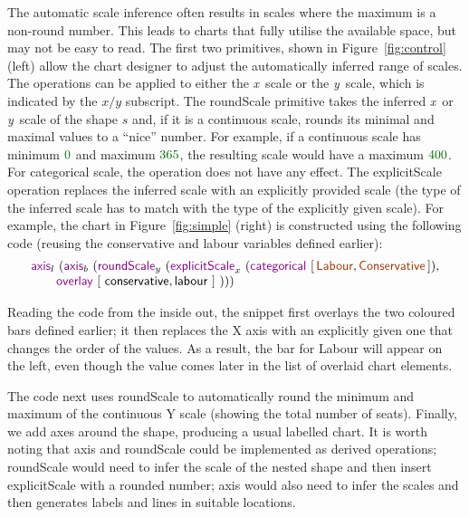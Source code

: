 \documentclass{jfp}
\newcommand{\X}{\emph{x}\ }
\newcommand{\Y}{\emph{y}\ }
\newcommand{\num}[1]{\textcolor{numclr}{#1}}
\newcommand{\strf}[1]{\textnormal{\textcolor{strclr}{\sffamily #1}}}
\newcommand{\ident}[1]{\textnormal{\textcolor{idclr}{\sffamily #1}}}
\newcommand{\kvd}[1]{\textnormal{\textcolor{kvdclr}{\sffamily #1}}}
\begin{document}
The automatic scale inference often results in scales where the maximum is a non-round number.
This leads to charts that fully utilise the available space, but may not be easy to read.
The first two primitives, shown in Figure~\ref{fig:control} (left) allow the chart designer
to adjust the automatically inferred range of scales.
The operations can be applied to either the \X scale or the \Y scale, which is indicated by the
$x/y$ subscript. The \kvd{roundScale} primitive takes the inferred \X or \Y scale of the shape $s$
and, if it is a continuous scale, rounds its minimal and maximal values to a ``nice'' number.
For example, if a continuous scale has minimum $\num{0}$ and maximum $\num{365}$, the resulting
scale would have a maximum $\num{400}$. For categorical scale, the operation does not have any effect.
The \kvd{explicitScale} operation replaces the inferred scale with an explicitly
provided scale (the type of the inferred scale has to match with the type of the explicitly given
scale). For example, the chart in Figure~\ref{fig:simple} (right) is constructed using the
following code (reusing the \ident{conservative} and \ident{labour} variables defined earlier):
%
\begin{equation*}
\begin{array}{l}
\kvd{axis}_l~(\kvd{axis}_b~(\kvd{roundScale}_y~(\kvd{explicitScale}_x~(\kvd{categorical}~[\,\strf{Labour},\strf{Conservative}\,]),\\
\qquad \kvd{overlay}~[~\ident{conservative}, \ident{labour}~]~)))\\
\end{array}
\end{equation*}
\vspace{-0.75em}

\noindent
Reading the code from the inside out, the snippet first overlays the two coloured bars defined
earlier; it then replaces the X axis with an explicitly given one that changes the order of the
values. As a result, the bar for \strf{Labour} will appear on the left, even though the value
comes later in the list of overlaid chart elements.

The code next uses \kvd{roundScale} to automatically round the minimum and maximum of the
continuous Y scale (showing the total number of seats). Finally, we add axes around the shape,
producing a usual labelled chart.  It is worth noting that \kvd{axis} and \kvd{roundScale}
could be implemented as derived operations; \kvd{roundScale} would need to infer the scale of
the nested shape and then insert \kvd{explicitScale} with a rounded number; \kvd{axis}
would also need to infer the scales and then generates labels and lines in suitable locations.
\end{document}
